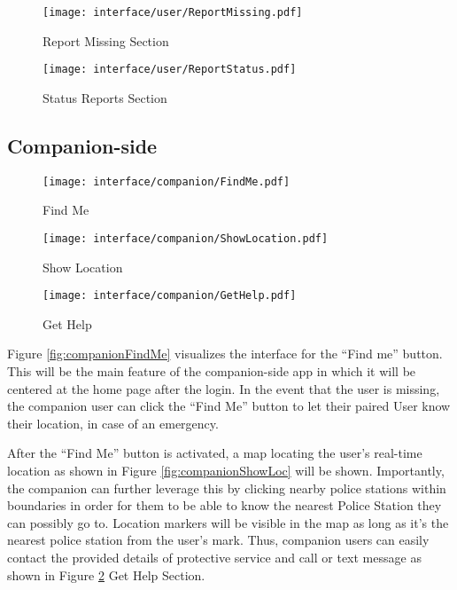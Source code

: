 \begin{figure}[!h]
    \centering
    \begin{minipage}[c]{0.50\linewidth}
        \centering
        \texttt{[image: interface/user/ReportMissing.pdf]}
        \caption{Report Missing Section}
        \label{fig:userReportMP}
    \end{minipage}\hfill
    \centering
    \begin{minipage}[c]{0.50\linewidth}
        \centering
        \texttt{[image: interface/user/ReportStatus.pdf]}
        \caption{Status Reports Section}
        \label{fig:userReportStatus}
    \end{minipage}
\end{figure}

\subsection{Companion-side}

\begin{figure}[t]
    \centering
    \begin{minipage}[c]{0.50\linewidth}
        \centering
    \texttt{[image: interface/companion/FindMe.pdf]}
    \caption{Find Me}
    \label{fig:companionFindMe}
    \end{minipage}\hfill
    \centering
    \begin{minipage}[c]{0.50\linewidth}
        \centering
        \texttt{[image: interface/companion/ShowLocation.pdf]}
        \caption{Show Location}
        \label{fig:companionShowLoc}
    \end{minipage}\hfill
    \centering
    \begin{minipage}[c]{0.50\linewidth}
        \centering
        \texttt{[image: interface/companion/GetHelp.pdf]}
        \caption{Get Help}
        \label{fig:companionGetHelp}
    \end{minipage}
\end{figure}
Figure \ref{fig:companionFindMe} visualizes the interface for the ``Find me” button. This will be the main feature of the companion-side app in which it will be centered at the home page after the login. In the event that the user is missing, the companion user can click the ``Find Me” button to let their paired User know their location, in case of an emergency. 

After the  ``Find Me” button is activated, a map locating the user’s real-time location as shown in Figure \ref{fig:companionShowLoc} will be shown. Importantly, the companion can further leverage this by clicking nearby police stations within boundaries in order for them to be able to know the nearest Police Station they can possibly go to. 
\newpage
Location markers will be visible in the map as long as it's the nearest police station from the user’s mark. Thus, companion users can easily contact the provided details of protective service and call or text message as shown in Figure \ref{fig:companionGetHelp} Get Help Section.